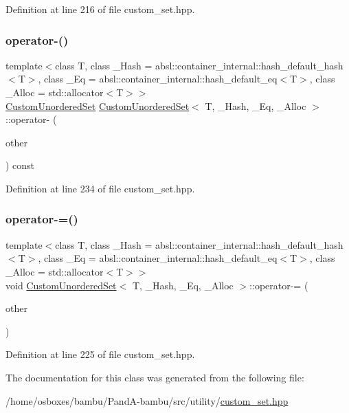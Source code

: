 Definition at line 216 of file custom\+\_\+set.\+hpp.

\mbox{\label{classCustomUnorderedSet_af4a229addefcc76c561f128b7dfc2425}} 
\subsubsection{\texorpdfstring{operator-\/()}{operator-()}}
{\footnotesize\ttfamily template$<$class T, class \+\_\+\+Hash = absl\+::container\+\_\+internal\+::hash\+\_\+default\+\_\+hash$<$\+T$>$, class \+\_\+\+Eq = absl\+::container\+\_\+internal\+::hash\+\_\+default\+\_\+eq$<$\+T$>$, class \+\_\+\+Alloc = std\+::allocator$<$\+T$>$$>$ \\
\hyperlink{classCustomUnorderedSet}{Custom\+Unordered\+Set} \hyperlink{classCustomUnorderedSet}{Custom\+Unordered\+Set}$<$ T, \+\_\+\+Hash, \+\_\+\+Eq, \+\_\+\+Alloc $>$\+::operator-\/ (\begin{DoxyParamCaption}\item[{const \hyperlink{classCustomUnorderedSet}{Custom\+Unordered\+Set}$<$ T, \+\_\+\+Hash, \+\_\+\+Eq, \+\_\+\+Alloc $>$ \&}]{other }\end{DoxyParamCaption}) const\hspace{0.3cm}{\ttfamily [inline]}}



Definition at line 234 of file custom\+\_\+set.\+hpp.

\mbox{\label{classCustomUnorderedSet_a7ea2ed096ab2af0dc8bcdb50b2b58f61}} 
\subsubsection{\texorpdfstring{operator-\/=()}{operator-=()}}
{\footnotesize\ttfamily template$<$class T, class \+\_\+\+Hash = absl\+::container\+\_\+internal\+::hash\+\_\+default\+\_\+hash$<$\+T$>$, class \+\_\+\+Eq = absl\+::container\+\_\+internal\+::hash\+\_\+default\+\_\+eq$<$\+T$>$, class \+\_\+\+Alloc = std\+::allocator$<$\+T$>$$>$ \\
void \hyperlink{classCustomUnorderedSet}{Custom\+Unordered\+Set}$<$ T, \+\_\+\+Hash, \+\_\+\+Eq, \+\_\+\+Alloc $>$\+::operator-\/= (\begin{DoxyParamCaption}\item[{const \hyperlink{classCustomUnorderedSet}{Custom\+Unordered\+Set}$<$ T, \+\_\+\+Hash, \+\_\+\+Eq, \+\_\+\+Alloc $>$ \&}]{other }\end{DoxyParamCaption})\hspace{0.3cm}{\ttfamily [inline]}}



Definition at line 225 of file custom\+\_\+set.\+hpp.



The documentation for this class was generated from the following file\+:\begin{DoxyCompactItemize}
\item 
/home/osboxes/bambu/\+Pand\+A-\/bambu/src/utility/\hyperlink{custom__set_8hpp}{custom\+\_\+set.\+hpp}\end{DoxyCompactItemize}
